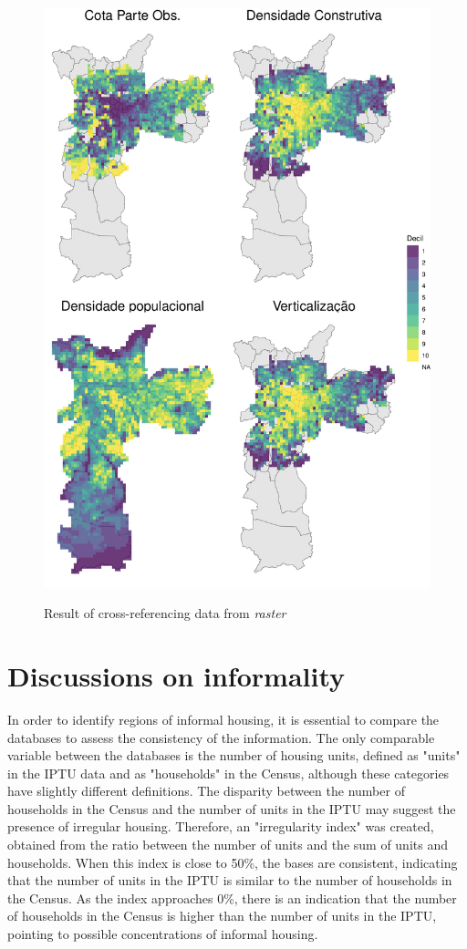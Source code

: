 \begin{apendicesenv}
    \begin{figure}[h]
        \centering
        \caption{Result of cross-referencing data from \textit{raster}}
        \includegraphics[width = .75\linewidth]{figuras/rasters.pdf}
        \label{fig:rasters}
    \end{figure}
    
    
    \chapter{Discussions on informality}
    \label{appendix:informality}
    
    In order to identify regions of informal housing, it is essential to compare the databases to assess the consistency of the information. The only comparable variable between the databases is the number of housing units, defined as "units" in the IPTU data and as "households" in the Census, although these categories have slightly different definitions. The disparity between the number of households in the Census and the number of units in the IPTU may suggest the presence of irregular housing. Therefore, an "irregularity index" was created, obtained from the ratio between the number of units and the sum of units and households. When this index is close to 50\%, the bases are consistent, indicating that the number of units in the IPTU is similar to the number of households in the Census. As the index approaches 0\%, there is an indication that the number of households in the Census is higher than the number of units in the IPTU, pointing to possible concentrations of informal housing.
    

\end{apendicesenv}
